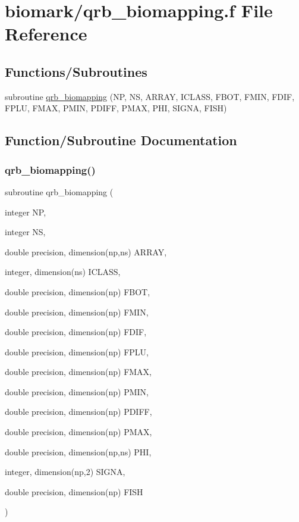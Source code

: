 \hypertarget{qrb__biomapping_8f}{}\section{biomark/qrb\+\_\+biomapping.f File Reference}
\label{qrb__biomapping_8f}
\subsection*{Functions/\+Subroutines}
\begin{DoxyCompactItemize}
\item 
subroutine \hyperlink{qrb__biomapping_8f_ab75af466ca5defeecfeca406d22b2f55}{qrb\+\_\+biomapping} (NP, NS, A\+R\+R\+AY, I\+C\+L\+A\+SS, F\+B\+OT, F\+M\+IN, F\+D\+IF, F\+P\+LU, F\+M\+AX, P\+M\+IN, P\+D\+I\+FF, P\+M\+AX, P\+HI, S\+I\+G\+NA, F\+I\+SH)
\end{DoxyCompactItemize}


\subsection{Function/\+Subroutine Documentation}
\mbox{\label{qrb__biomapping_8f_ab75af466ca5defeecfeca406d22b2f55}} 
\subsubsection{\texorpdfstring{qrb\+\_\+biomapping()}{qrb\_biomapping()}}
{\footnotesize\ttfamily subroutine qrb\+\_\+biomapping (\begin{DoxyParamCaption}\item[{integer}]{NP,  }\item[{integer}]{NS,  }\item[{double precision, dimension(np,ns)}]{A\+R\+R\+AY,  }\item[{integer, dimension(ns)}]{I\+C\+L\+A\+SS,  }\item[{double precision, dimension(np)}]{F\+B\+OT,  }\item[{double precision, dimension(np)}]{F\+M\+IN,  }\item[{double precision, dimension(np)}]{F\+D\+IF,  }\item[{double precision, dimension(np)}]{F\+P\+LU,  }\item[{double precision, dimension(np)}]{F\+M\+AX,  }\item[{double precision, dimension(np)}]{P\+M\+IN,  }\item[{double precision, dimension(np)}]{P\+D\+I\+FF,  }\item[{double precision, dimension(np)}]{P\+M\+AX,  }\item[{double precision, dimension(np,ns)}]{P\+HI,  }\item[{integer, dimension(np,2)}]{S\+I\+G\+NA,  }\item[{double precision, dimension(np)}]{F\+I\+SH }\end{DoxyParamCaption})}

